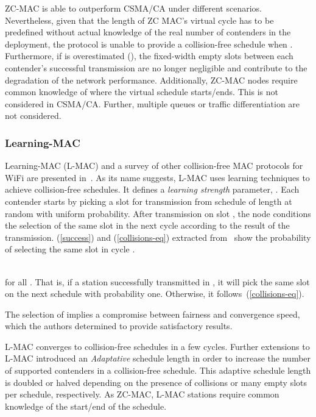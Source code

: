 \documentclass[a4paper]{article}
\begin{document}
ZC-MAC is able to outperform CSMA/CA under different scenarios. Nevertheless, given that the length of ZC MAC's virtual cycle has to be predefined without actual knowledge of the real number of contenders in the deployment, the protocol is unable to provide a collision-free schedule when . Furthermore, if  is overestimated (), the fixed-width empty slots between each contender's successful transmission are no longer negligible and contribute to the degradation of the network performance. Additionally, ZC-MAC nodes require common knowledge of where the virtual schedule starts/ends. This is not considered in CSMA/CA. Further, multiple queues or traffic differentiation are not considered.

\subsubsection{Learning-MAC}
Learning-MAC (L-MAC) and a survey of other collision-free MAC protocols for WiFi are presented in~\cite{L_MAC}. As its name suggests, L-MAC uses learning techniques to achieve collision-free schedules. It defines a \emph{learning strength} parameter, . Each contender starts by picking a slot  for transmission from schedule  of length  at random with uniform probability. After transmission on slot , the node conditions the selection of the same slot in the next cycle according to the result of the transmission. (\ref{success}) and (\ref{collisions-eq}) extracted from~\cite{L_MAC} show the probability of selecting the same slot  in cycle .



\\
for all . That is, if a station successfully transmitted in , it will pick the same slot on the next schedule with probability one. Otherwise, it follows~(\ref{collisions-eq}).

The selection of  implies a compromise between fairness and convergence speed, which the authors determined  to provide satisfactory results.

L-MAC converges to collision-free schedules in a few cycles. Further extensions to L-MAC introduced an \emph{Adaptative} schedule length in order to increase the number of supported contenders in a collision-free schedule. This adaptive schedule length is doubled or halved depending on the presence of collisions or many empty slots per schedule, respectively. As ZC-MAC, L-MAC stations require common knowledge of the start/end of the schedule. 
\end{document}
